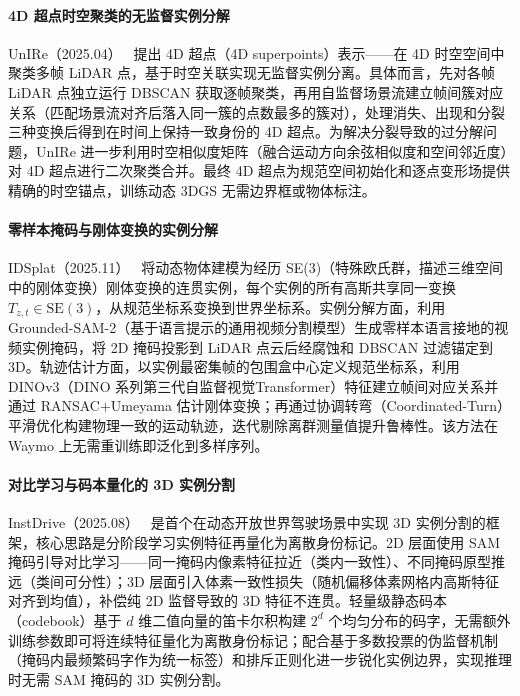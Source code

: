 \paragraph{4D 超点时空聚类的无监督实例分解}

UnIRe（2025.04）~\cite{2504_00763} 提出 4D 超点（4D superpoints）表示——在 4D 时空空间中聚类多帧 LiDAR 点，基于时空关联实现无监督实例分离。具体而言，先对各帧 LiDAR 点独立运行 DBSCAN 获取逐帧聚类，再用自监督场景流建立帧间簇对应关系（匹配场景流对齐后落入同一簇的点数最多的簇对），处理消失、出现和分裂三种变换后得到在时间上保持一致身份的 4D 超点。为解决分裂导致的过分解问题，UnIRe 进一步利用时空相似度矩阵（融合运动方向余弦相似度和空间邻近度）对 4D 超点进行二次聚类合并。最终 4D 超点为规范空间初始化和逐点变形场提供精确的时空锚点，训练动态 3DGS 无需边界框或物体标注。

\paragraph{零样本掩码与刚体变换的实例分解}

IDSplat（2025.11）~\cite{2511_19235} 将动态物体建模为经历 SE(3)（特殊欧氏群，描述三维空间中的刚体变换）刚体变换的连贯实例，每个实例的所有高斯共享同一变换 $T_{z,t} \in \text{SE}(3)$，从规范坐标系变换到世界坐标系。实例分解方面，利用 Grounded-SAM-2（基于语言提示的通用视频分割模型）生成零样本语言接地的视频实例掩码，将 2D 掩码投影到 LiDAR 点云后经腐蚀和 DBSCAN 过滤锚定到 3D。轨迹估计方面，以实例最密集帧的包围盒中心定义规范坐标系，利用 DINOv3（DINO 系列第三代自监督视觉Transformer）特征建立帧间对应关系并通过 RANSAC+Umeyama 估计刚体变换；再通过协调转弯（Coordinated-Turn）平滑优化构建物理一致的运动轨迹，迭代剔除离群测量值提升鲁棒性。该方法在 Waymo 上无需重训练即泛化到多样序列。

\paragraph{对比学习与码本量化的 3D 实例分割}

InstDrive（2025.08）~\cite{2508_12015} 是首个在动态开放世界驾驶场景中实现 3D 实例分割的框架，核心思路是分阶段学习实例特征再量化为离散身份标记。2D 层面使用 SAM 掩码引导对比学习——同一掩码内像素特征拉近（类内一致性）、不同掩码原型推远（类间可分性）；3D 层面引入体素一致性损失（随机偏移体素网格内高斯特征对齐到均值），补偿纯 2D 监督导致的 3D 特征不连贯。轻量级静态码本（codebook）基于 $d$ 维二值向量的笛卡尔积构建 $2^d$ 个均匀分布的码字，无需额外训练参数即可将连续特征量化为离散身份标记；配合基于多数投票的伪监督机制（掩码内最频繁码字作为统一标签）和排斥正则化进一步锐化实例边界，实现推理时无需 SAM 掩码的 3D 实例分割。


